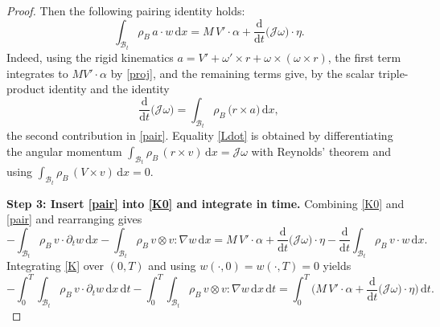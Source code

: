 \documentclass[11pt,twoside,reqno]{amsart}
\numberwithin{equation}{section}
\numberwithin{figure}{section}
\begin{document}
\begin{proof}
Then the following pairing identity holds:
\begin{equation}
\int_{\mathcal B_t}\rho_B\,a\cdot w\,\mathrm{d}x
= M\,{V'}\cdot\alpha + \frac{\mathrm{d}}{\mathrm{d}t}\big(\mathcal J\omega\big)\cdot\eta.
\label{pair}
\end{equation}
Indeed, using the rigid kinematics
$a={V'}+{\omega'}\times r+\omega\times(\omega\times r)$,
the first term integrates to $M{V'}\cdot \alpha$ by \eqref{proj}, and the remaining
terms give, by the scalar triple-product identity and the identity
\begin{equation}
\frac{\mathrm{d}}{\mathrm{d}t}\big(\mathcal J\omega\big)
=\int_{\mathcal B_t}\rho_B\,\big(r\times a\big)\,\mathrm{d}x,
\label{Ldot}
\end{equation}
the second contribution in \eqref{pair}. Equality \eqref{Ldot} is obtained by differentiating the
angular momentum $\int_{\mathcal B_t}\rho_B\,( r\times v)\,\mathrm{d}x=\mathcal J\omega$
with Reynolds' theorem and using $\int_{\mathcal B_t}\rho_B\,(V\times v)\,\mathrm{d}x
= 0$.

\noindent\textbf{Step 3: Insert \eqref{pair} into \eqref{K0} and integrate in time.}
Combining \eqref{K0} and \eqref{pair} and rearranging gives
\begin{equation}
-\!\!\int_{\mathcal B_t}\rho_B\, v\cdot\partial_t w\,\mathrm{d}x
-\!\!\int_{\mathcal B_t}\rho_B\, v\otimes v:\nabla w\,\mathrm{d}x
= M\,{V'}\cdot \alpha + \frac{\mathrm{d}}{\mathrm{d}t}\big(\mathcal J\omega\big)\cdot\eta
-\frac{\mathrm{d}}{\mathrm{d}t}\int_{\mathcal B_t}\rho_B\,v\cdot w\,\mathrm{d}x.
\label{K}
\end{equation}
Integrating \eqref{K} over $(0,T)$ and using $w(\cdot,0)=w(\cdot,T) =0$ yields
\begin{equation}
-\!\!\int_0^T\!\!\int_{\mathcal B_t}\rho_B\,v\cdot\partial_tw\,\mathrm{d}x\,\mathrm{d}t
-\!\!\int_0^T\!\!\int_{\mathcal B_t}\rho_B\,v\otimes v:\nabla w\,\mathrm{d}x\,\mathrm{d}t
= \int_0^T \Big(M\,{V'}\cdot \alpha
+\frac{\mathrm{d}}{\mathrm{d}t}\big(\mathcal J\omega\big)\cdot\eta\Big)\,\mathrm{d}t.
\label{weak-left}
\end{equation}


\end{proof}
\end{document}
